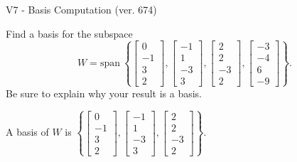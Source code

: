 \begin{exercise}
  \begin{exerciseTitle}V7 - Basis Computation (ver. 674)\end{exerciseTitle}
  \begin{exerciseStatement}
    Find a basis for the subspace 
\[W=\mathrm{span}\ \left\{\left[\begin{array}{r}
0 \\
-1 \\
3 \\
2
\end{array}\right] , \left[\begin{array}{r}
-1 \\
1 \\
-3 \\
3
\end{array}\right] , \left[\begin{array}{r}
2 \\
2 \\
-3 \\
2
\end{array}\right] , \left[\begin{array}{r}
-3 \\
-4 \\
6 \\
-9
\end{array}\right]\right\}.\]
 Be sure to explain why your result is a basis.


  \end{exerciseStatement}
  \begin{exerciseAnswer}
   A basis of \(W\) is  \(\left\{\left[\begin{array}{r}
0 \\
-1 \\
3 \\
2
\end{array}\right] , \left[\begin{array}{r}
-1 \\
1 \\
-3 \\
3
\end{array}\right] , \left[\begin{array}{r}
2 \\
2 \\
-3 \\
2
\end{array}\right]\right\}\).
  


  \end{exerciseAnswer}
\end{exercise}